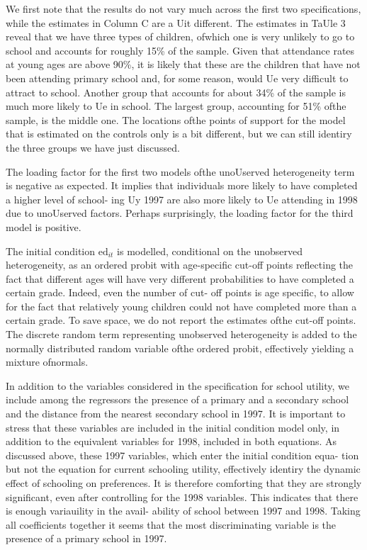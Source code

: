 We first note that the results do not vary much across the first two specifications, while the estimates in Column $\mathrm{C}$ are a Uit different. The estimates in TaUle 3 reveal that we have three types of children, ofwhich one is very unlikely to go to school and accounts for roughly 15\% of the sample. Given that attendance rates at young ages are above 90\%, it is likely that these are the children that have not been attending primary school and, for some reason, would Ue very difficult to attract to school. Another group that accounts for about 34\% of the sample is much more likely to Ue in school. The largest group, accounting for 51\% ofthe sample, is the middle one. The locations ofthe points of support for the model that is estimated on the controls only is a bit different, but we can still identiry the three groups we have just discussed.

The loading factor for the first two models ofthe unoUserved heterogeneity term is negative as expected. It implies that individuals more likely to have completed a higher level of school- ing Uy 1997 are also more likely to Ue attending in 1998 due to unoUserved factors. Perhaps surprisingly, the loading factor for the third model is positive.

The initial condition $\mathrm{e}\mathrm{d}_{it}$ is modelled, conditional on the unobserved heterogeneity, as an ordered probit with age-specific cut-off points reflecting the fact that different ages will have very different probabilities to have completed a certain grade. Indeed, even the number of cut- off points is age specific, to allow for the fact that relatively young children could not have completed more than a certain grade. To save space, we do not report the estimates ofthe cut-off points. The discrete random term representing unobserved heterogeneity is added to the normally distributed random variable ofthe ordered probit, effectively yielding a mixture ofnormals.

In addition to the variables considered in the specification for school utility, we include among the regressors the presence of a primary and a secondary school and the distance from the nearest secondary school in 1997. It is important to stress that these variables are included in the initial condition model only, in addition to the equivalent variables for 1998, included in both equations. As discussed above, these 1997 variables, which enter the initial condition equa- tion but not the equation for current schooling utility, effectively identiry the dynamic effect of schooling on preferences. It is therefore comforting that they are strongly significant, even after controlling for the 1998 variables. This indicates that there is enough variauility in the avail- ability of school between 1997 and 1998. Taking all coefficients together it seems that the most discriminating variable is the presence of a primary school in 1997.


